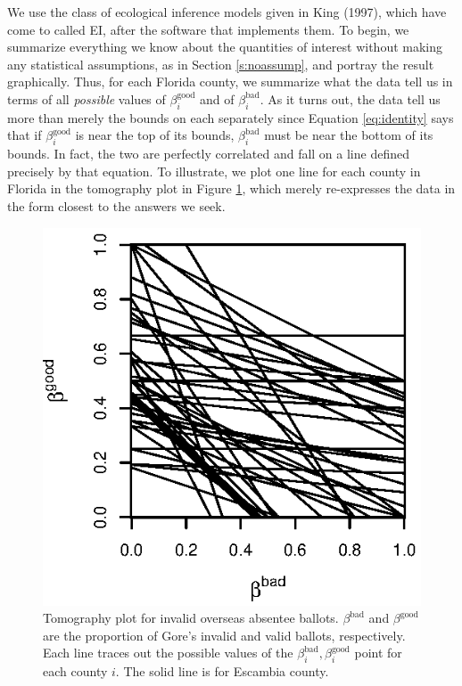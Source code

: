 \documentclass[11pt,titlepage]{article}
\newcommand{\bb}{\beta^{\text{bad}}}
\newcommand{\bg}{\beta^{\text{good}}}
\begin{document}
We use the class of ecological inference models given in King
(1997)\nocite{king:97}, which have come to called EI, after the
software that implements them.  To begin, we summarize everything we
know about the quantities of interest without making any statistical
assumptions, as in Section \ref{s:noassump}, and portray the result
graphically.  Thus, for each Florida county, we summarize what the
data tell us in terms of all \emph{possible} values of $\bg_i$ and of
$\bb_i$.  As it turns out, the data tell us more than merely the
bounds on each separately since Equation \ref{eq:identity} says that
if $\bg_i$ is near the top of its bounds, $\bb_i$ must be near the
bottom of its bounds.  In fact, the two are perfectly correlated and
fall on a line defined precisely by that equation.  To illustrate, we
plot one line for each county in Florida in the tomography plot in
Figure \ref{fg:tomog}, which merely re-expresses the data in the form
closest to the answers we seek.
\begin{figure}[t]
  \begin{minipage}[c]{6.5in}
    \begin{center}
      \includegraphics{tomog-rev}
    \end{center}
  \end{minipage}
  \caption{\label{fg:tomog}
    Tomography plot for invalid overseas absentee ballots.  $\bb$ and
    $\bg$ are the proportion of Gore's invalid and valid ballots,
    respectively.  Each line traces out the possible values of the
    $\bb_i,\bg_i$ point for each county $i$. The solid line is for
    Escambia county.}
\end{figure}
\end{document}
